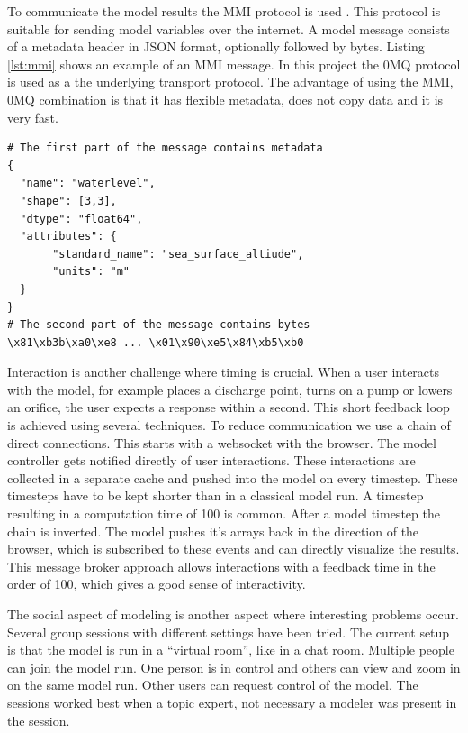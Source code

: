 \documentclass[a4paper]{article}
\begin{document}
To communicate the model results the \ac{MMI} protocol is used \citep{Baart2014a}. This protocol is suitable for sending model variables over the internet. A model message consists of a metadata header in \ac{JSON} format, optionally followed by bytes. Listing \ref{lst:mmi} shows an example of an \ac{MMI} message. In this project the \ac{0MQ} protocol is used as a the underlying transport protocol. The advantage of using the \ac{MMI}, \ac{0MQ} combination is that it has flexible metadata, does not copy data and it is very fast.

\begin{lstlisting}[caption=MMI message,label=lst:mmi]
# The first part of the message contains metadata
{
  "name": "waterlevel",
  "shape": [3,3],
  "dtype": "float64",
  "attributes": {
       "standard_name": "sea_surface_altiude",
       "units": "m"
  }
}
# The second part of the message contains bytes
\x81\xb3b\xa0\xe8 ... \x01\x90\xe5\x84\xb5\xb0
\end{lstlisting}

Interaction is another challenge where timing is crucial. When a user interacts with the model, for example places a discharge point, turns on a pump or lowers an orifice, the user expects a response within a second. This short feedback loop is achieved using several techniques. To reduce communication we use a chain of direct connections. This starts with a websocket \citep{Hickson2012} with the browser. The model controller gets notified directly of user interactions. These interactions are collected in a separate cache and pushed into the model on every timestep. These timesteps have to be kept shorter than in a classical model run. A timestep resulting in a computation time of \si{100}{\mili\second} is common. After a model timestep the chain is inverted. The model pushes it's arrays back in the direction of the browser, which is subscribed to these events and can directly visualize the results. This message broker approach allows interactions with a feedback time in the order of \si{100}{\mili\second}, which gives a good sense of interactivity.

The social aspect of modeling is another aspect where interesting problems occur. Several group sessions with different settings have been tried. The current setup is that the model is run in a ``virtual room'', like in a chat room. Multiple people can join the model run. One person is in control and others can view and zoom in on the same model run. Other users can request control of the model. The sessions worked best when a topic expert, not necessary a modeler was present in the session.
\end{document}

